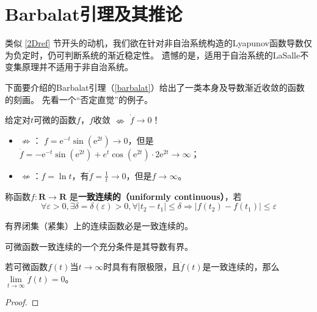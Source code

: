 \section{Barbalat引理及其推论}\label{3Eref}
类似 \ref{2Dref} 节开头的动机，我们欲在针对非自治系统构造的Lyapunov函数导数仅为负定时，仍可判断系统的渐近稳定性。
遗憾的是，适用于自治系统的LaSalle不变集原理并不适用于非自治系统。

下面要介绍的Barbalat引理（\ref{barbalat}）给出了一类本身及导数渐近收敛的函数的刻画。
先看一个“否定直觉”的例子。
\begin{example}
    给定对$t$可微的函数$f$，$f$收敛  $\nLeftrightarrow $ $\dot{f} \rightarrow 0$！
  \begin{itemize}[leftmargin=1em]
    \item $\nRightarrow $： $f = \mathrm{e}^{- t} \sin (\mathrm{e}^{2 t}) \rightarrow 0$，但是$ \dot{f} = - \mathrm{e}^{- t} \sin
    (\mathrm{e}^{2 t}) + e^t \cos (\mathrm{e}^{2 t}) \cdot 2 \mathrm{e}^{2 t} \rightarrow \infty$；
    
    \item $\nLeftarrow $：$f = \ln  t$，有$ \dot{f} = \frac{1}{t} \rightarrow0$，但是$f \rightarrow \infty$。
  \end{itemize}
\end{example}
\begin{definition}
    称函数$f : \mathbf{R} \rightarrow \mathbf{R}$ 是{\bf 一致连续的（uniformly continuous）}，若
     \[\forall \varepsilon > 0, \exists \delta
  = \delta (\varepsilon) > 0, \forall | t_2 - t_1 | \leq \delta \Rightarrow |
  f (t_2) - f (t_1) | \leq \varepsilon\]
\end{definition}
\begin{lemma}
    有界闭集（紧集）上的连续函数必是一致连续的。
\end{lemma}
\begin{lemma}
    可微函数一致连续的一个充分条件是其导数有界。
\end{lemma}
\begin{theorem}[Barbalat引理]\label{barbalat}
    若可微函数$f(t)$当$t\to\infty$时具有有限极限，且$\dot{f}(t)$是一致连续的，那么$\lim\limits_{t\to\infty}\dot{f}(t)=0$。
\end{theorem}
\begin{proof}
    
\end{proof}
\begin{theorem}
    
\end{theorem}
